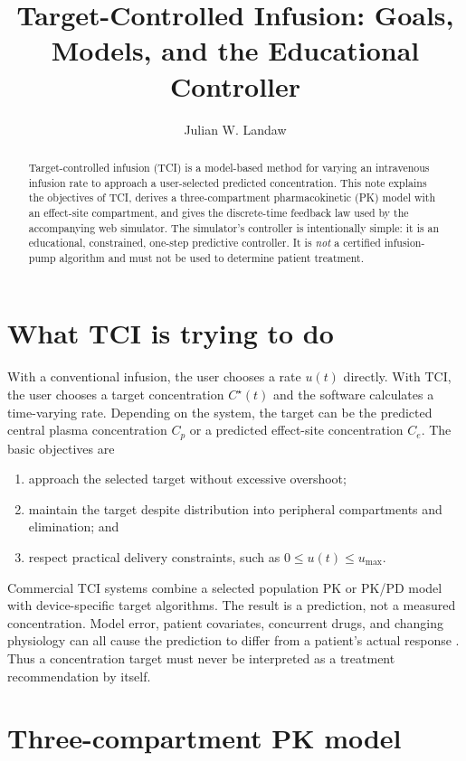 \documentclass[11pt]{article}
\title{Target-Controlled Infusion: Goals, Models, and the Educational Controller}
\author{Julian W. Landaw}
\date{}
\begin{document}
\maketitle

\begin{abstract}
Target-controlled infusion (TCI) is a model-based method for varying an intravenous infusion rate to approach a user-selected predicted concentration. This note explains the objectives of TCI, derives a three-compartment pharmacokinetic (PK) model with an effect-site compartment, and gives the discrete-time feedback law used by the accompanying web simulator. The simulator's controller is intentionally simple: it is an educational, constrained, one-step predictive controller. It is \emph{not} a certified infusion-pump algorithm and must not be used to determine patient treatment.
\end{abstract}

\section{What TCI is trying to do}

With a conventional infusion, the user chooses a rate $u(t)$ directly. With TCI, the user chooses a target concentration $C^\star(t)$ and the software calculates a time-varying rate. Depending on the system, the target can be the predicted central plasma concentration $C_p$ or a predicted effect-site concentration $C_e$. The basic objectives are
\begin{enumerate}
  \item approach the selected target without excessive overshoot;
  \item maintain the target despite distribution into peripheral compartments and elimination; and
  \item respect practical delivery constraints, such as $0 \leq u(t) \leq u_{\max}$.
\end{enumerate}

Commercial TCI systems combine a selected population PK or PK/PD model with device-specific target algorithms. The result is a prediction, not a measured concentration. Model error, patient covariates, concurrent drugs, and changing physiology can all cause the prediction to differ from a patient's actual response \cite{TCIreview,PKPDreview}. Thus a concentration target must never be interpreted as a treatment recommendation by itself.

\section{Three-compartment PK model}
\end{document}
